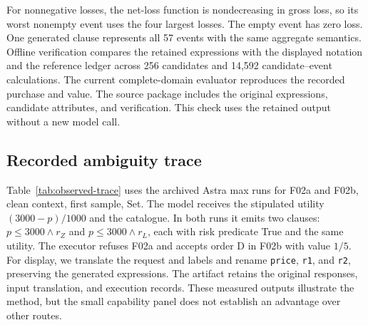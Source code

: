 For nonnegative losses, the net-loss function is nondecreasing in gross loss, so its worst nonempty event uses the four largest losses. The empty event has zero loss. One generated clause represents all 57 events with the same aggregate semantics. Offline verification compares the retained expressions with the displayed notation and the reference ledger across 256 candidates and 14,592 candidate--event calculations. The current complete-domain evaluator reproduces the recorded purchase and value. The source package includes the original expressions, candidate attributes, and verification. This check uses the retained output without a new model call.

\subsection{Recorded ambiguity trace}
\label{app:observed-trace}
Table~\ref{tab:observed-trace} uses the archived Astra max runs for F02a and F02b, clean context, first sample, Set. The model receives the stipulated utility $(3000-p)/1000$ and the catalogue. In both runs it emits two clauses: $p\le3000\wedge r_Z$ and $p\le3000\wedge r_L$, each with risk predicate True and the same utility. The executor refuses F02a and accepts order D in F02b with value $1/5$. For display, we translate the request and labels and rename \texttt{price}, \texttt{r1}, and \texttt{r2}, preserving the generated expressions. The artifact retains the original responses, input translation, and execution records. These measured outputs illustrate the method, but the small capability panel does not establish an advantage over other routes.

